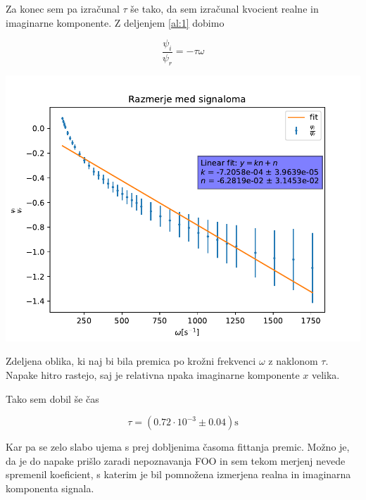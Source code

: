 \documentclass[11pt]{article}
\renewcommand{%
  \refname}{Viri}
\begin{document}
Za konec sem pa izračunal \(\tau\) še tako, da sem izračunal kvocient realne in imaginarne komponente. Z deljenjem \ref{al:1} dobimo

\[ \frac{\psi_i}{\psi_r} = - \tau \omega
\]

\begin{slika}[H]
  \begin{center}
    \includegraphics[width=.9\linewidth]{figures/deljena}
  \end{center}
  \caption{\small Zdeljena oblika, ki naj bi bila premica po krožni frekvenci \( \omega \) z naklonom \( \tau \). Napake hitro rastejo, saj je relativna npaka imaginarne komponente \( x \) velika.}
\end{slika}


Tako sem dobil še čas

\[ \tau = (0.72 \cdot 10^{-3} \pm 0.04) \mathrm{s}
\]

Kar pa se zelo slabo ujema s prej dobljenima časoma fittanja premic. Možno je, da je do napake prišlo zaradi nepoznavanja FOO in sem tekom merjenj nevede spremenil koeficient, s katerim je bil pomnožena izmerjena realna in imaginarna komponenta signala.




\end{document}
